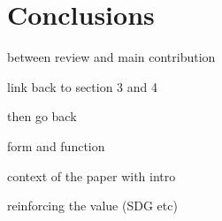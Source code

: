 \section{Conclusions}
\label{sec:conclusions}


between review and main contribution



link back to section 3 and 4

then go back

form and function

context of the paper with intro


reinforcing the value (SDG etc)








